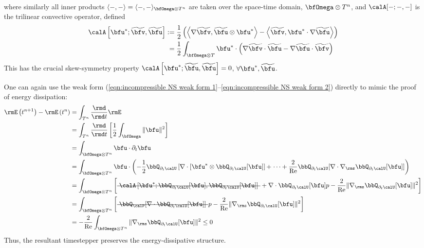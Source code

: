     where similarly all inner products $\langle -, -\rangle  =  \langle -, -\rangle_{\bfOmega\otimes T^{n}}$ are taken over the space-time domain, $\bfOmega\otimes T^{n}$, and $\calA[-; -, -]$ is the trilinear convective operator, defined
    \begin{align}
        \calA\left[\bfu^{*}; \widetilde{\bfv}, \widetilde{\bfu}\right]  :=  &\;\frac{1}{2}\left(\left\langle\nabla\widetilde{\bfv}, \widetilde{\bfu}\otimes\bfu^{*}\right\rangle - \left\langle\widetilde{\bfv}, \bfu^{*}\cdot\nabla\widetilde{\bfu}\right\rangle\right)  \label{eqn:convective operator definition}  \\
                                                                         =  &\;\frac{1}{2}\int_{\bfOmega\otimes T}\bfu^{*}\cdot\left(\nabla\widetilde{\bfv}\cdot\widetilde{\bfu} - \nabla\widetilde{\bfu}\cdot\widetilde{\bfv}\right)
    \end{align}
    This has the crucial skew-symmetry property $\calA\left[\bfu^{*}; \widetilde{\bfu}, \widetilde{\bfu}\right]  =  0$, $\forall \bfu^{*}, \widetilde{\bfu}$.

    \begin{remark}
    \end{remark}

    One can again use the weak form (\ref{eqn:incompressible NS weak form 1}--\ref{eqn:incompressible NS weak form 2}) directly to mimic the proof of energy dissipation:
    \begin{align}
        \rmE\left(t^{n + 1}\right) - \rmE\left(t^{n}\right)  &=  \int_{T^{n}}\frac{\rmd}{\rmd t}\rmE  \\
        &=  \int_{T^{n}}\frac{\rmd}{\rmd t}\left[\frac{1}{2}\int_{\bfOmega}\|\bfu\|^{2}\right]  \\
        &=  \int_{\bfOmega\otimes T^{n}}\bfu\cdot\partial_{t}\bfu  \\
        &=  \int_{\bfOmega\otimes T^{n}}\bfu\cdot\left(- \frac{1}{2}\bbQ_{\partial_{t}\calU}\left[\nabla\cdot\left[\bfu^{*}\otimes\bbQ_{\partial_{t}\calU}[\bfu]\right] + \right. \cdots + \frac{2}{\rmRe}\bbQ_{\partial_{t}\calU}[\nabla\cdot\nabla_{\rms}\bbQ_{\partial_{t}\calU}[\bfu]]\right)  \\
        &=  \int_{\bfOmega\otimes T^{n}}\left[\mst{\calA\left[\bfu^{*}; \bbQ_{\partial_{t}\calU}[\bfu], \bbQ_{\partial_{t}\calU}[\bfu]\right]} + \nabla\cdot\bbQ_{\partial_{t}\calU}[\bfu]p - \frac{2}{\rmRe}\|\nabla_{\rms}\bbQ_{\partial_{t}\calU}[\bfu]\|^{2}\right]  \\
        &=  \int_{\bfOmega\otimes T^{n}}\left[\mst{\bbQ_{\calP}[\nabla\cdot\bbQ_{\partial_{t}\calU}[\bfu]]}p - \frac{2}{\rmRe}\|\nabla_{\rms}\bbQ_{\partial_{t}\calU}[\bfu]\|^{2}\right]  \\
        &=  - \frac{2}{\rmRe}\int_{\bfOmega\otimes T^{n}}\|\nabla_{\rms}\bbQ_{\partial_{t}\calU}[\bfu]\|^{2}  \leq  0  \label{eqn:incompressible NS weak form dissipation}
    \end{align}
    Thus, the resultant timestepper preserves the energy-dissipative structure.

